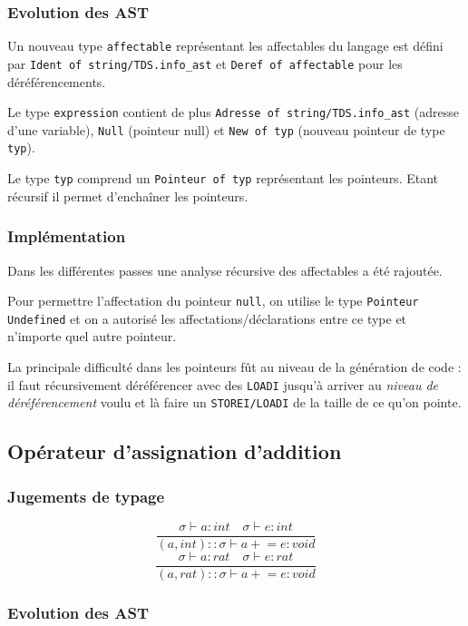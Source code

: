\documentclass[headings=standardclasses,parskip=half]{scrartcl}
\begin{document}
\subsubsection*{Evolution des AST}

Un nouveau type \texttt{affectable} représentant les affectables du
langage est défini par \texttt{Ident of string/TDS.info\_ast} et
\texttt{Deref of affectable} pour les déréférencements.

Le type \texttt{expression} contient de plus
\texttt{Adresse of string/TDS.info\_ast} (adresse d'une variable),
\texttt{Null} (pointeur null) et \texttt{New of typ} (nouveau pointeur
de type \texttt{typ}).

Le type \texttt{typ} comprend un \texttt{Pointeur of typ} représentant
les pointeurs. Etant récursif il permet d'enchaîner les pointeurs.

\subsubsection*{Implémentation}

Dans les différentes passes une analyse récursive des affectables
a été rajoutée.

Pour permettre l'affectation du pointeur \texttt{null},
on utilise le type \texttt{Pointeur Undefined}
et on a autorisé les affectations/déclarations entre ce type
et n'importe quel autre pointeur.

La principale difficulté dans les pointeurs fût au niveau de
la génération de code : il faut récursivement déréférencer avec des
\texttt{LOADI} jusqu'à arriver au \textit{niveau de déréférencement}
voulu et là faire un \texttt{STOREI/LOADI} de la taille de ce
qu'on pointe.

\subsection{Opérateur d'assignation d'addition}

\subsubsection*{Jugements de typage}

\[\frac{\sigma \vdash a : int \quad \sigma \vdash e : int}
    {(a,int)::\sigma \vdash a \mathrel{+}= e : void}\]
\[\frac{\sigma \vdash a : rat \quad \sigma \vdash e : rat}
    {(a,rat)::\sigma \vdash a \mathrel{+}= e : void}\]

\subsubsection*{Evolution des AST}
\end{document}
